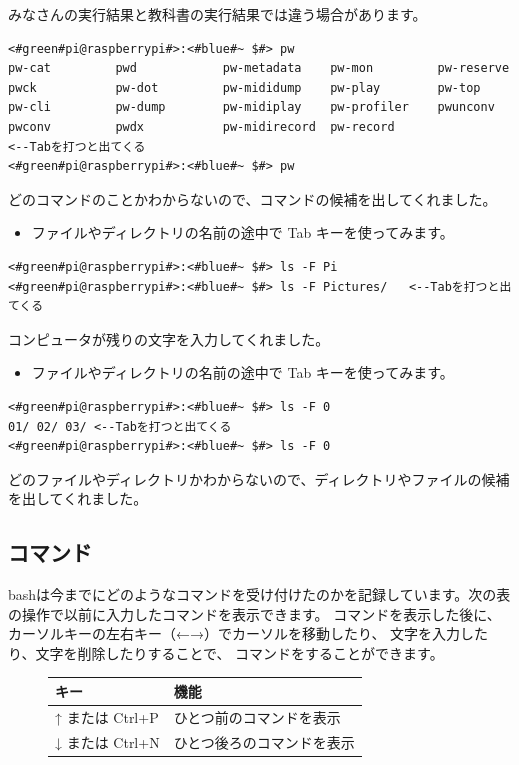 みなさんの実行結果と教科書の実行結果では違う場合があります。
\begin{lstlisting}[caption=Tabの例1, label=Tab1]
<#green#pi@raspberrypi#>:<#blue#~ $#> pw
pw-cat         pwd            pw-metadata    pw-mon         pw-reserve
pwck           pw-dot         pw-mididump    pw-play        pw-top
pw-cli         pw-dump        pw-midiplay    pw-profiler    pwunconv
pwconv         pwdx           pw-midirecord  pw-record                 <--Tabを打つと出てくる
<#green#pi@raspberrypi#>:<#blue#~ $#> pw
\end{lstlisting}
どのコマンドのことかわからないので、コマンドの候補を出してくれました。
\begin{itemize}
\item[<例>]ファイルやディレクトリの名前の途中で Tab キーを使ってみます。
\end{itemize}
\begin{lstlisting}[caption=Tabの例2, label=Tab2]
<#green#pi@raspberrypi#>:<#blue#~ $#> ls -F Pi
<#green#pi@raspberrypi#>:<#blue#~ $#> ls -F Pictures/	<--Tabを打つと出てくる
\end{lstlisting}
コンピュータが残りの文字を入力してくれました。
\begin{itemize}
\item[<例>]ファイルやディレクトリの名前の途中で Tab キーを使ってみます。
\end{itemize}
\begin{lstlisting}[caption=Tabの例3, label=Tab3]
<#green#pi@raspberrypi#>:<#blue#~ $#> ls -F 0
01/	02/	03/	<--Tabを打つと出てくる
<#green#pi@raspberrypi#>:<#blue#~ $#> ls -F 0
\end{lstlisting}
どのファイルやディレクトリかわからないので、ディレクトリやファイルの候補を出してくれました。

\subsection{コマンド}
bashは今までにどのようなコマンドを受け付けたのかを記録しています。次の表の操作で以前に入力したコマンドを表示できます。
コマンドを表示した後に、カーソルキーの左右キー（←→）でカーソルを移動したり、
文字を入力したり、文字を削除したりすることで、
コマンドをすることができます。

\begin{figure}[h]
  \center
  \begin{tabular}{ll}\hline
    キー & 機能 \\ \hline
    ↑ または Ctrl+P & ひとつ前のコマンドを表示\\
    ↓ または Ctrl+N & ひとつ後ろのコマンドを表示\\ \hline
  \end{tabular}
\end{figure}


